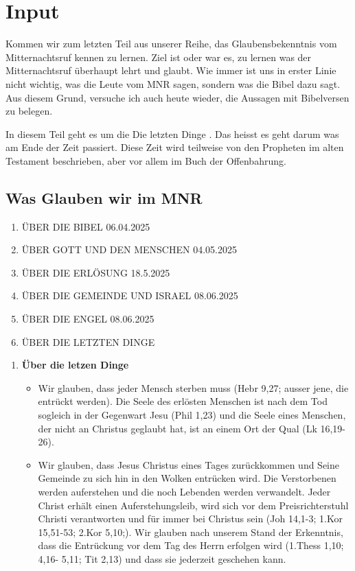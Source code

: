 \documentclass{../../inc/mybib}
\begin{document}
\section{ Input }
\begin{spacing}{1.5}

Kommen wir zum letzten Teil aus unserer Reihe, das Glaubensbekenntnis vom Mitternachtsruf kennen zu lernen. Ziel ist oder war es, zu lernen was der Mitternachtsruf überhaupt lehrt und glaubt. Wie immer ist uns in erster Linie nicht wichtig, was die Leute vom MNR sagen, sondern was die Bibel dazu sagt. Aus diesem Grund, versuche ich auch heute wieder, die Aussagen mit Bibelversen zu belegen.

In diesem Teil geht es um die \flqq Die letzten Dinge \frqq{}. Das heisst es geht darum was am Ende der Zeit passiert. Diese Zeit wird teilweise von den Propheten im alten Testament beschrieben, aber vor allem im Buch der Offenbahrung.

\subsection{Was Glauben wir im MNR}
    \begin{enumerate}
        \item \uppercase{über die bibel} 06.04.2025
        \item \uppercase{über gott und den Menschen} 04.05.2025
        \item \uppercase{über die Erlösung} 18.5.2025
        \item \uppercase{über die Gemeinde und Israel} 08.06.2025
        \item \uppercase{über die Engel} 08.06.2025
        \item \uppercase{über die letzten Dinge}
    \end{enumerate}
    \begin{enumerate}      
      \item \textbf{Über die letzen Dinge} 
        \begin{itemize}
            \item Wir glauben, dass jeder Mensch sterben muss (Hebr 9,27; ausser jene, die entrückt werden). Die Seele des erlösten Menschen ist nach dem Tod sogleich in der Gegenwart Jesu (Phil 1,23) und die Seele eines Menschen, der nicht an Christus geglaubt hat, ist an einem Ort der Qual (Lk 16,19-26).

            \item Wir glauben, dass Jesus Christus eines Tages zurückkommen und Seine Gemeinde zu sich hin in den Wolken entrücken wird. Die Verstorbenen werden auferstehen und die noch Lebenden werden verwandelt. Jeder Christ erhält einen Auferstehungsleib, wird sich vor dem Preisrichterstuhl Christi verantworten und für immer bei Christus sein (Joh 14,1-3; 1.Kor 15,51-53; 2.Kor 5,10;). Wir glauben nach unserem Stand der Erkenntnis, dass die Entrückung vor dem Tag des Herrn erfolgen wird (1.Thess 1,10; 4,16- 5,11; Tit 2,13) und dass sie jederzeit geschehen kann.
            

\end{itemize}
\end{enumerate}
\end{spacing}
\end{document}
